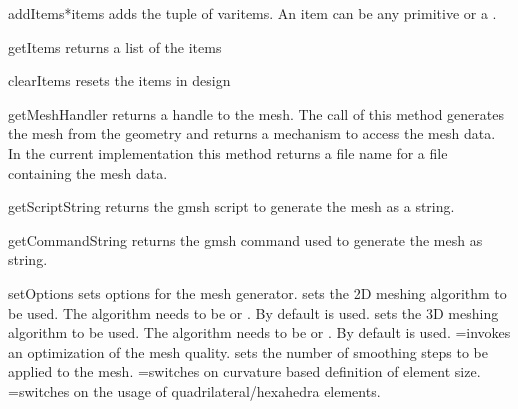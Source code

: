 \begin{methoddesc}[Design]{addItems}{*items}
adds the tuple of var{items}. An item can be any primitive or a .
\end{methoddesc}

\begin{methoddesc}[Design]{getItems}{}
returns a list of the items
\end{methoddesc}

\begin{methoddesc}[Design]{clearItems}{}
resets the items in design
\end{methoddesc}

\begin{methoddesc}[Design]{getMeshHandler}{}
returns a handle to the mesh. The call of this method generates the mesh from the geometry and
returns a mechanism to access the mesh data. In the current implementation this
method returns a file name for a file containing the mesh data.
\end{methoddesc}

\begin{methoddesc}[Design]{getScriptString}{}
returns the gmsh script to generate the mesh as a string.
\end{methoddesc}

\begin{methoddesc}[Design]{getCommandString}{}
returns the gmsh command used to generate the mesh as string.
\end{methoddesc}

\begin{methoddesc}[Design]{setOptions}{
}
sets options for the mesh generator.  sets the 2D meshing algorithm to be used.
The algorithm needs to be 
or . By default  is used.
 sets the 3D  meshing algorithm to be used.
The algorithm needs to be 
or 
. By default  is used.
=\True invokes an optimization of the mesh quality.
 sets the number of smoothing steps to be applied to the mesh.
=\True switches on curvature based definition of element size.
=\True switches on the usage of quadrilateral/hexahedra elements.
\end{methoddesc}

